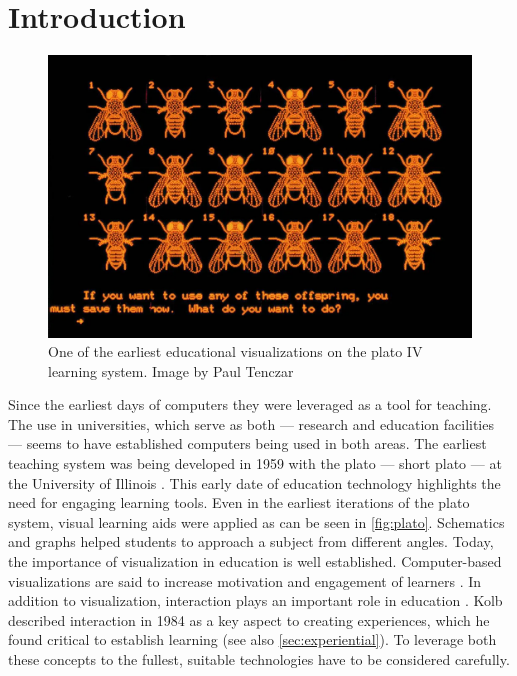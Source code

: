 %





\chapter{Introduction}
\label{sec:intro}

\begin{figure}[b!]
	\centering
	\includegraphics[width=\linewidth]{pictures/plato.png}
	\captionsetup{labelfont=bf,textfont=it}
	\caption[Educational visualizations on the \acrshort{plato} system. Taken from \cite{lapsley2017review}]{One of the earliest educational visualizations on the \acrshort{plato} IV learning system. Image by Paul Tenczar \cite{lapsley2017review} \label{fig:plato}}
\end{figure}

Since the earliest days of computers they were leveraged as a tool for teaching.
The use in universities, which serve as both --- research and education facilities --- seems to have established computers being used in both areas.
The earliest teaching system was being developed in 1959 with the \acrlong{plato} --- short \acrshort{plato} --- at the University of Illinois \cite{cope2023history}.
This early date of education technology highlights the need for engaging learning tools.
Even in the earliest iterations of the \acrshort{plato} system, visual learning aids were applied as can be seen in \autoref{fig:plato}.
Schematics and graphs helped students to approach a subject from different angles.
Today, the importance of visualization in education is well established.
Computer-based visualizations are said to increase motivation and engagement of learners \cite{vavra2011visualization}.
In addition to visualization, interaction plays an important role in education \cite{firat2018towards}.
Kolb described interaction in 1984 \cite{kolb:1984:experiential} as a key aspect to creating experiences, which he found critical to establish learning (see also \autoref{sec:experiential}).
To leverage both these concepts to the fullest, suitable technologies have to be considered carefully.

